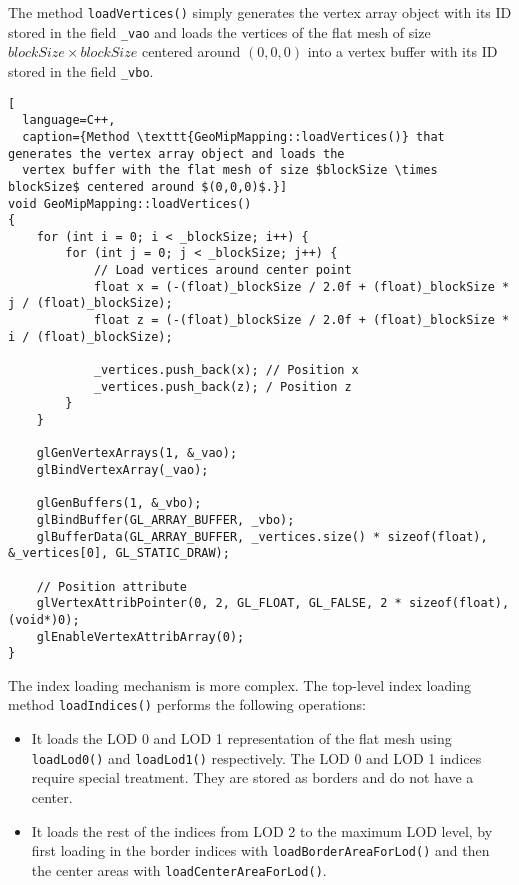 The method \texttt{loadVertices()} simply generates the vertex array object with its ID stored in the field \texttt{\_vao}
and loads the vertices of the flat mesh of size $blockSize \times blockSize$
centered around $(0,0,0)$ into a vertex buffer with its ID stored in the field \texttt{\_vbo}.
\begin{lstlisting}[
  language=C++,
  caption={Method \texttt{GeoMipMapping::loadVertices()} that generates the vertex array object and loads the
  vertex buffer with the flat mesh of size $blockSize \times blockSize$ centered around $(0,0,0)$.}]
void GeoMipMapping::loadVertices()
{
    for (int i = 0; i < _blockSize; i++) {
        for (int j = 0; j < _blockSize; j++) {
            // Load vertices around center point 
            float x = (-(float)_blockSize / 2.0f + (float)_blockSize * j / (float)_blockSize);
            float z = (-(float)_blockSize / 2.0f + (float)_blockSize * i / (float)_blockSize);

            _vertices.push_back(x); // Position x 
            _vertices.push_back(z); / Position z 
        }
    }

    glGenVertexArrays(1, &_vao);
    glBindVertexArray(_vao);

    glGenBuffers(1, &_vbo);
    glBindBuffer(GL_ARRAY_BUFFER, _vbo);
    glBufferData(GL_ARRAY_BUFFER, _vertices.size() * sizeof(float), &_vertices[0], GL_STATIC_DRAW);

    // Position attribute
    glVertexAttribPointer(0, 2, GL_FLOAT, GL_FALSE, 2 * sizeof(float), (void*)0);
    glEnableVertexAttribArray(0);
}
\end{lstlisting}

The index loading mechanism is more complex.
The top-level index loading method \texttt{loadIndices()}
performs the following operations:
\begin{itemize}
  \item It loads the LOD 0 and LOD 1 representation of the flat mesh using \texttt{loadLod0()} and \texttt{loadLod1()} respectively. The LOD 0 and LOD 1 indices require special treatment. They are stored as borders and do not have a center.
  \item It loads the rest of the indices from LOD 2 to the maximum LOD level, by first loading in the border indices with \texttt{loadBorderAreaForLod()}
        and then the center areas with \texttt{loadCenterAreaForLod()}.
\end{itemize}

